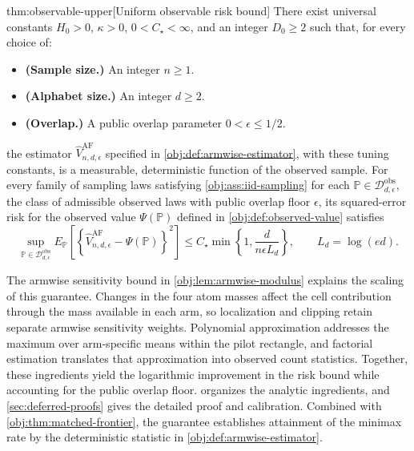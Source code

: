 \begin{theoremv}{thm:observable-upper}[Uniform observable risk bound]
There exist universal constants \(H_0>0\), \(\kappa>0\), \(0<C_\star<\infty\), and an integer \(D_0\ge2\) such that, for every choice of:
\begin{itemize}
\item \textbf{(Sample size.)} An integer \(n\ge1\).
\item \textbf{(Alphabet size.)} An integer \(d\ge2\).
\item \textbf{(Overlap.)} A public overlap parameter \(0<\epsilon\le1/2\).
\end{itemize}
the estimator \(\widehat V_{n,d,\epsilon}^{\mathrm{AF}}\) specified in \cref{obj:def:armwise-estimator}, with these tuning constants, is a measurable, deterministic function of the observed sample. For every family of sampling laws satisfying \cref{obj:ass:iid-sampling} for each \(\mathbb P\in\mathcal D_{d,\epsilon}^{\mathrm{obs}}\), the class of admissible observed laws with public overlap floor \(\epsilon\), its squared-error risk for the observed value \(\Psi(\mathbb P)\) defined in \cref{obj:def:observed-value} satisfies
\[
\sup_{\mathbb P\in\mathcal D_{d,\epsilon}^{\mathrm{obs}}}
E_{\mathbb P}\!\left[
\left\{\widehat V_{n,d,\epsilon}^{\mathrm{AF}}-\Psi(\mathbb P)\right\}^{2}
\right]
\le C_\star\min\left\{1,\frac{d}{n\epsilon L_d}\right\},
\qquad L_d=\log(ed).
\]
\end{theoremv}

The armwise sensitivity bound in \cref{obj:lem:armwise-modulus} explains the scaling of this guarantee. Changes in the four atom masses affect the cell contribution through the mass available in each arm, so localization and clipping retain separate armwise sensitivity weights. Polynomial approximation addresses the maximum over arm-specific means within the pilot rectangle, and factorial estimation translates that approximation into observed count statistics. Together, these ingredients yield the logarithmic improvement in the risk bound while accounting for the public overlap floor.  organizes the analytic ingredients, and \cref{sec:deferred-proofs} gives the detailed proof and calibration. Combined with \cref{obj:thm:matched-frontier}, the guarantee establishes attainment of the minimax rate by the deterministic statistic in \cref{obj:def:armwise-estimator}.
